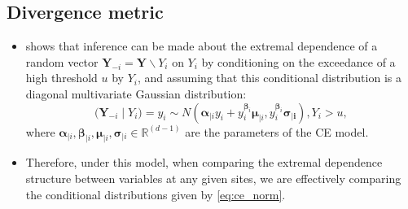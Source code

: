 \documentclass{article}
\numberwithin{equation}{section}
\begin{document}
\subsection{Divergence metric} \label{subsec:div}


\begin{itemize}
  \item \citet{Heffernan2004} shows that inference can be made about the extremal dependence of a random vector $\bm{Y}_{-i} = \bm{Y} \backslash Y_i$ on $Y_i$ by conditioning on the exceedance of a high threshold $u$ by $Y_i$, and assuming that this conditional distribution is a diagonal multivariate Gaussian distribution: %
    \begin{equation} \label{eq:ce_norm}
       \bigl( \bm{Y}_{-i} \mid Y_i \bigr) = y_i \sim N\left(\bm{\alpha}_{\mid i} y_i + y_i^{\bm{\beta}_i} \bm{\mu}_{\mid i}, y_i^{\bm{\beta}_i} \bm{\sigma_{\mid i}}\right), Y_i > u,
    \end{equation}
    where $\bm{\alpha}_{\mid i}, \bm{\beta}_{\mid i}, \bm{\mu}_{\mid i}, \bm{\sigma}_{\mid i} \in \mathbb{R}^{(d-1)}$ are the parameters of the CE model.
  \item Therefore, under this model, when comparing the extremal dependence structure between variables at any given sites, we are effectively comparing the conditional distributions given by \eqref{eq:ce_norm}.
\end{itemize}

\vspace{1cm}
\end{document}
